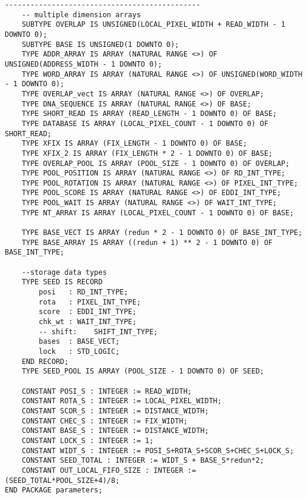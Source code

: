 \begin{lstlisting}[frame=single]
	----------------------------------------------
	-- multiple dimension arrays 
	SUBTYPE OVERLAP IS UNSIGNED(LOCAL_PIXEL_WIDTH + READ_WIDTH - 1 DOWNTO 0);
	SUBTYPE BASE IS UNSIGNED(1 DOWNTO 0);
	TYPE ADDR_ARRAY IS ARRAY (NATURAL RANGE <>) OF UNSIGNED(ADDRESS_WIDTH - 1 DOWNTO 0);
	TYPE WORD_ARRAY IS ARRAY (NATURAL RANGE <>) OF UNSIGNED(WORD_WIDTH - 1 DOWNTO 0);
	TYPE OVERLAP_vect IS ARRAY (NATURAL RANGE <>) OF OVERLAP;
	TYPE DNA_SEQUENCE IS ARRAY (NATURAL RANGE <>) OF BASE;
	TYPE SHORT_READ IS ARRAY (READ_LENGTH - 1 DOWNTO 0) OF BASE;
	TYPE DATABASE IS ARRAY (LOCAL_PIXEL_COUNT - 1 DOWNTO 0) OF SHORT_READ;
	TYPE XFIX IS ARRAY (FIX_LENGTH - 1 DOWNTO 0) OF BASE;
	TYPE XFIX_2 IS ARRAY (FIX_LENGTH * 2 - 1 DOWNTO 0) OF BASE;
	TYPE OVERLAP_POOL IS ARRAY (POOL_SIZE - 1 DOWNTO 0) OF OVERLAP;
	TYPE POOL_POSITION IS ARRAY (NATURAL RANGE <>) OF RD_INT_TYPE;
	TYPE POOL_ROTATION IS ARRAY (NATURAL RANGE <>) OF PIXEL_INT_TYPE;
	TYPE POOL_SCORE IS ARRAY (NATURAL RANGE <>) OF EDDI_INT_TYPE;
	TYPE POOL_WAIT IS ARRAY (NATURAL RANGE <>) OF WAIT_INT_TYPE;
	TYPE NT_ARRAY IS ARRAY (LOCAL_PIXEL_COUNT - 1 DOWNTO 0) OF BASE;

	TYPE BASE_VECT IS ARRAY (redun * 2 - 1 DOWNTO 0) OF BASE_INT_TYPE;
	TYPE BASE_ARRAY IS ARRAY ((redun + 1) ** 2 - 1 DOWNTO 0) OF BASE_INT_TYPE;

	--storage data types
	TYPE SEED IS RECORD
		posi   : RD_INT_TYPE;
		rota   : PIXEL_INT_TYPE;
		score  : EDDI_INT_TYPE;
		chk_wt : WAIT_INT_TYPE;
		-- shift:    SHIFT_INT_TYPE;
		bases  : BASE_VECT;
		lock   : STD_LOGIC;
	END RECORD;
	TYPE SEED_POOL IS ARRAY (POOL_SIZE - 1 DOWNTO 0) OF SEED;

	CONSTANT POSI_S : INTEGER := READ_WIDTH;
	CONSTANT ROTA_S : INTEGER := LOCAL_PIXEL_WIDTH;
	CONSTANT SCOR_S : INTEGER := DISTANCE_WIDTH;
	CONSTANT CHEC_S : INTEGER := FIX_WIDTH;
	CONSTANT BASE_S : INTEGER := DISTANCE_WIDTH; 
	CONSTANT LOCK_S : INTEGER := 1;
	CONSTANT WIDT_S : INTEGER := POSI_S+ROTA_S+SCOR_S+CHEC_S+LOCK_S;
	CONSTANT SEED_TOTAL : INTEGER := WIDT_S + BASE_S*redun*2;
	CONSTANT OUT_LOCAL_FIFO_SIZE : INTEGER := (SEED_TOTAL*POOL_SIZE+4)/8;
END PACKAGE parameters;



\end{lstlisting}
